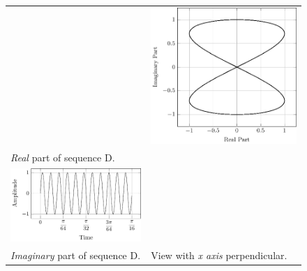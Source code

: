 \documentclass[../../course]{subfiles}
\begin{document}
\begin{figure} [H]
\begin{NiceTabularX} {\textwidth} {
            *{2}{>{\centering\arraybackslash}X}
        }
        &

         {
             {
                \includegraphics[height = \textheight] {tikzpics/plotFrontViewComplexD.pdf}
            }
        }

        \\

         {\emph{Real} part of sequence D.}
        \label{plt:realCmplxD}

        &
        \\

         {
             {
                \includegraphics[height = \textheight] {tikzpics/plotShortX2.pdf}
            }
        }

        &
        \\

         {\emph{Imaginary} part of sequence D.}
        \label{plt:imagCmplxD}

        &

         {View with \emph{x axis} perpendicular.}
        \label{plt:frontViewCmplxD}

        \\

    \end{NiceTabularX}

\end{figure}
\end{document}
